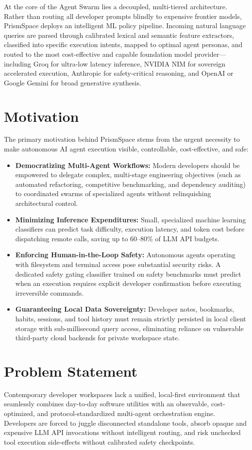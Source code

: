 \documentclass[12pt,a4paper]{report}
\begin{document}
At the core of the Agent Swarm lies a decoupled, multi-tiered architecture. Rather than routing all developer prompts blindly to expensive frontier models, PrismSpace deploys an intelligent ML policy pipeline. Incoming natural language queries are parsed through calibrated lexical and semantic feature extractors, classified into specific execution intents, mapped to optimal agent personas, and routed to the most cost-effective and capable foundation model provider—including Groq for ultra-low latency inference, NVIDIA NIM for sovereign accelerated execution, Anthropic for safety-critical reasoning, and OpenAI or Google Gemini for broad generative synthesis.

\section{Motivation}
The primary motivation behind PrismSpace stems from the urgent necessity to make autonomous AI agent execution visible, controllable, cost-effective, and safe:
\begin{itemize}
    \item \textbf{Democratizing Multi-Agent Workflows:} Modern developers should be empowered to delegate complex, multi-stage engineering objectives (such as automated refactoring, competitive benchmarking, and dependency auditing) to coordinated swarms of specialized agents without relinquishing architectural control.
    \item \textbf{Minimizing Inference Expenditures:} Small, specialized machine learning classifiers can predict task difficulty, execution latency, and token cost before dispatching remote calls, saving up to 60--80\% of LLM API budgets.
    \item \textbf{Enforcing Human-in-the-Loop Safety:} Autonomous agents operating with filesystem and terminal access pose substantial security risks. A dedicated safety gating classifier trained on safety benchmarks must predict when an execution requires explicit developer confirmation before executing irreversible commands.
    \item \textbf{Guaranteeing Local Data Sovereignty:} Developer notes, bookmarks, habits, sessions, and tool history must remain strictly persisted in local client storage with sub-millisecond query access, eliminating reliance on vulnerable third-party cloud backends for private workspace state.
\end{itemize}

\section{Problem Statement}
Contemporary developer workspaces lack a unified, local-first environment that seamlessly combines day-to-day software utilities with an observable, cost-optimized, and protocol-standardized multi-agent orchestration engine. Developers are forced to juggle disconnected standalone tools, absorb opaque and expensive LLM API invocations without intelligent routing, and risk unchecked tool execution side-effects without calibrated safety checkpoints. 
\end{document}
